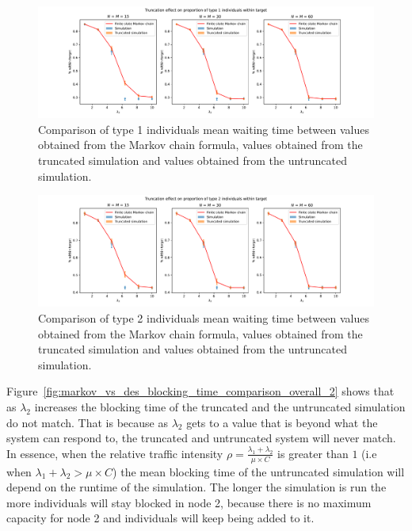 \begin{figure}[H]
    \includegraphics[width=\textwidth]{chapters/03_queueing_model/img/numeric_results_and_timings/truncation_effect_2/proportion_type_1.pdf}
    \caption{
        Comparison of type 1 individuals mean waiting time between values
        obtained from the Markov chain formula, values obtained from the
        truncated simulation and values obtained from the untruncated
        simulation.
    }
    \label{fig:markov_vs_des_proportion_within_time_comparison_type_1_2}
\end{figure}

\begin{figure}[H]
    \includegraphics[width=\textwidth]{chapters/03_queueing_model/img/numeric_results_and_timings/truncation_effect_2/proportion_type_2.pdf}
    \caption{
        Comparison of type 2 individuals mean waiting time between values
        obtained from the Markov chain formula, values obtained from the
        truncated simulation and values obtained from the untruncated
        simulation.
    }
    \label{fig:markov_vs_des_proportion_within_time_comparison_type_2_2}
\end{figure}


Figure~\ref{fig:markov_vs_des_blocking_time_comparison_overall_2} shows that as
\(\lambda_2\) increases the blocking time of the truncated and the untruncated
simulation do not match.
That is because as \(\lambda_2\) gets to a value that is beyond what the system
can respond to, the truncated and untruncated system will never match.
In essence, when the relative traffic intensity
\(\rho = \frac{\lambda_1 + \lambda_2}{\mu \times C}\) is greater than \(1\) (i.e
when \(\lambda_1 + \lambda_2 > \mu \times C\)) the mean blocking time of the
untruncated simulation will depend on the runtime of the simulation.
The longer the simulation is run the more individuals will stay blocked in
node 2, because there is no maximum capacity for node 2 and individuals will
keep being added to it.

